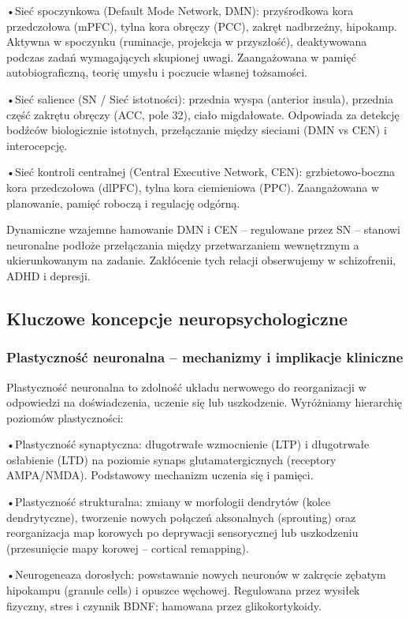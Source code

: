 \documentclass[11pt,a4paper]{article}
\begin{document}
•Sieć spoczynkowa (Default Mode Network, DMN): przyśrodkowa kora przedczołowa (mPFC), tylna
kora obręczy (PCC), zakręt nadbrzeżny, hipokamp. Aktywna w spoczynku (ruminacje, projekcja
w przyszłość), deaktywowana podczas zadań wymagających skupionej uwagi. Zaangażowana
w pamięć autobiograficzną, teorię umysłu i poczucie własnej tożsamości.

•Sieć salience (SN / Sieć istotności): przednia wyspa (anterior insula), przednia część zakrętu obręczy
(ACC, pole 32), ciało migdałowate. Odpowiada za detekcję bodźców biologicznie istotnych,
przełączanie między sieciami (DMN vs CEN) i interocepcję.

•Sieć kontroli centralnej (Central Executive Network, CEN): grzbietowo-boczna kora przedczołowa
(dlPFC), tylna kora ciemieniowa (PPC). Zaangażowana w planowanie, pamięć roboczą i regulację
odgórną.

Dynamiczne wzajemne hamowanie DMN i CEN – regulowane przez SN – stanowi neuronalne podłoże
przełączania między przetwarzaniem wewnętrznym a ukierunkowanym na zadanie. Zakłócenie tych relacji
obserwujemy w schizofrenii, ADHD i depresji.

\subsection{Kluczowe koncepcje neuropsychologiczne}

\subsubsection{Plastyczność neuronalna – mechanizmy i implikacje kliniczne}

Plastyczność neuronalna to zdolność układu nerwowego do reorganizacji w odpowiedzi na doświadczenia,
uczenie się lub uszkodzenie. Wyróżniamy hierarchię poziomów plastyczności:

•Plastyczność synaptyczna: długotrwałe wzmocnienie (LTP) i długotrwałe osłabienie (LTD) na poziomie
synaps glutamatergicznych (receptory AMPA/NMDA). Podstawowy mechanizm uczenia się i pamięci.

•Plastyczność strukturalna: zmiany w morfologii dendrytów (kolce dendrytyczne), tworzenie nowych
połączeń aksonalnych (sprouting) oraz reorganizacja map korowych po deprywacji sensorycznej lub
uszkodzeniu (przesunięcie mapy korowej – cortical remapping).

•Neurogeneaza dorosłych: powstawanie nowych neuronów w zakręcie zębatym hipokampu (granule
cells) i opuszce węchowej. Regulowana przez wysiłek fizyczny, stres i czynnik BDNF; hamowana przez
glikokortykoidy.
\end{document}
